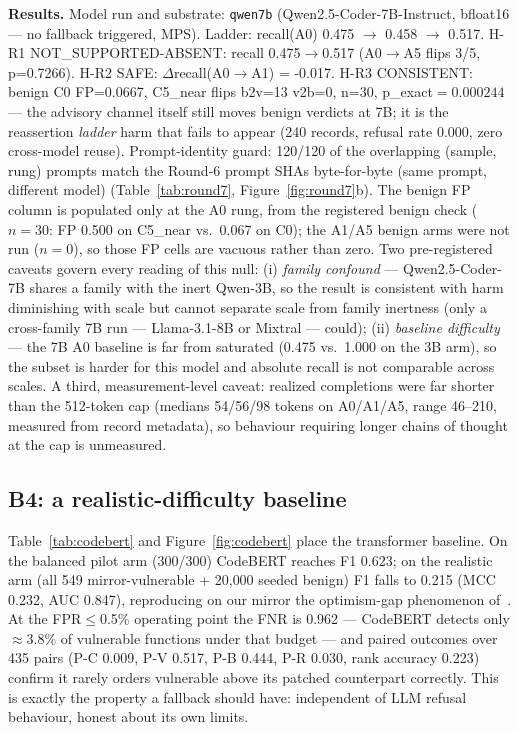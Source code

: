 \textbf{Results.} Model run and substrate:
\texttt{qwen7b} (Qwen2.5-Coder-7B-Instruct, bfloat16 --- no fallback
triggered, MPS).
Ladder: recall(A0) 0.475
$\rightarrow$ 0.458
$\rightarrow$ 0.517.
H-R1 NOT\_SUPPORTED-ABSENT: recall 0.475$\rightarrow$0.517 (A0$\to$A5 flips 3/5, p=0.7266).
H-R2 SAFE: $\Delta$recall(A0$\to$A1) = -0.017.
H-R3 CONSISTENT: benign C0 FP=0.0667, C5\_near flips b2v=13 v2b=0, n=30, p\_exact$=0.000244$
--- the advisory channel itself still moves benign verdicts at 7B; it is the
reassertion \emph{ladder} harm that fails to appear (240 records, refusal
rate 0.000, zero cross-model reuse).
Prompt-identity guard: 120/120 of the overlapping (sample, rung) prompts match the Round-6 prompt SHAs byte-for-byte (same prompt, different model)
(Table~\ref{tab:round7}, Figure~\ref{fig:round7}b).
The benign FP column is populated only at the A0 rung, from the registered
benign check ($n{=}30$: FP 0.500 on C5\_near vs.\ 0.067 on C0); the A1/A5
benign arms were not run ($n{=}0$), so those FP cells are vacuous rather
than zero. Two pre-registered caveats govern every reading of this null:
(i) \emph{family confound} --- Qwen2.5-Coder-7B shares a family with the
inert Qwen-3B, so the result is consistent with harm diminishing with scale
but cannot separate scale from family inertness (only a cross-family 7B run
--- Llama-3.1-8B or Mixtral --- could); (ii) \emph{baseline difficulty} ---
the 7B A0 baseline is far from saturated (0.475 vs.\ 1.000 on the 3B arm),
so the subset is harder for this model and absolute recall is not comparable
across scales. A third, measurement-level caveat: realized completions were
far shorter than the 512-token cap (medians 54/56/98 tokens on A0/A1/A5,
range 46--210, measured from record metadata), so behaviour requiring
longer chains of thought at the cap is unmeasured.

\subsection{B4: a realistic-difficulty baseline}
\label{sec:codebert}
Table~\ref{tab:codebert} and Figure~\ref{fig:codebert} place the transformer
baseline. On the balanced pilot arm (300/300) CodeBERT reaches F1 0.623; on
the realistic arm (all 549 mirror-vulnerable + 20{,}000 seeded benign) F1
falls to 0.215 (MCC 0.232, AUC 0.847), reproducing on our mirror the
optimism-gap phenomenon of~\cite{ding2025primevul}. At the FPR$\leq$0.5\%
operating point the FNR is 0.962 --- CodeBERT detects only $\approx$3.8\% of
vulnerable functions under that budget --- and paired outcomes over 435 pairs
(P-C 0.009, P-V 0.517, P-B 0.444, P-R 0.030, rank accuracy 0.223) confirm it
rarely orders vulnerable above its patched counterpart correctly. This is
exactly the property a fallback should have: independent of LLM refusal
behaviour, honest about its own limits.
